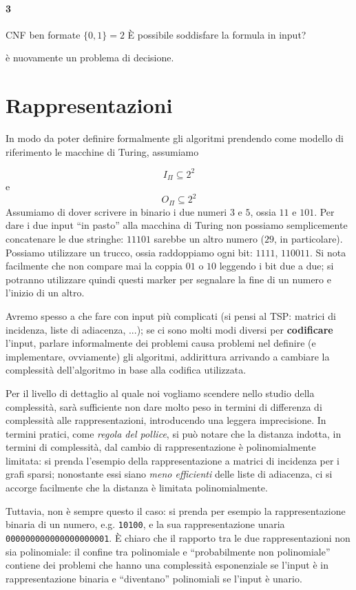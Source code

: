 \paragraph{3}
 {CNF ben formate} {$\{0, 1\} = 2$} {\`E possibile soddisfare la formula in input?}

è nuovamente un problema di decisione.

\section{Rappresentazioni}
In modo da poter definire formalmente gli algoritmi prendendo come modello
di riferimento le macchine di Turing, assumiamo

$$
	I_{\Pi} \subseteq 2^2
$$
e
$$
	O_{\Pi} \subseteq 2^2
$$
Assumiamo di dover scrivere in binario i due numeri $3$ e $5$, ossia $11$ e $101$.
Per dare i due input ``in pasto'' alla macchina di Turing non possiamo
semplicemente concatenare le due stringhe: $11101$ sarebbe un altro numero
($29$, in particolare). Possiamo utilizzare un trucco, ossia raddoppiamo ogni
bit: $1111$, $110011$. Si nota facilmente che non compare mai la coppia $01$ o
$10$ leggendo i bit due a due; si potranno utilizzare quindi questi marker per
segnalare la fine di un numero e l'inizio di un altro.

Avremo spesso a che fare con input più complicati
(si pensi al \textsc{TSP}: matrici di incidenza, liste di adiacenza, ...);
se ci sono molti modi diversi per \textbf{codificare} l'input, parlare informalmente
dei problemi causa problemi nel definire (e implementare, ovviamente)
gli algoritmi, addirittura arrivando a cambiare la complessità dell'algoritmo
in base alla codifica utilizzata.

Per il livello di dettaglio al quale noi vogliamo scendere nello studio della
complessità, sarà sufficiente non dare molto peso in termini di differenza di complessità
alle rappresentazioni, introducendo una leggera imprecisione. In termini pratici,
come \textit{regola del pollice}, si può notare che la distanza indotta,
in termini di complessità, dal cambio di rappresentazione è polinomialmente
limitata: si prenda l'esempio della rappresentazione a matrici di incidenza
per i grafi sparsi; nonostante essi siano \textit{meno efficienti} delle liste
di adiacenza, ci si accorge facilmente che la distanza è limitata polinomialmente.

Tuttavia, non è sempre questo il caso: si prenda per esempio la rappresentazione
binaria di un numero, e.g. \texttt{10100}, e la sua rappresentazione unaria
\texttt{000000000000000000001}. \`E chiaro che il rapporto tra le due
rappresentazioni non sia polinomiale: il confine tra polinomiale e ``probabilmente
non polinomiale'' contiene dei problemi che hanno una complessità esponenziale
se l'input è in rappresentazione binaria e ``diventano'' polinomiali se l'input
è unario.

